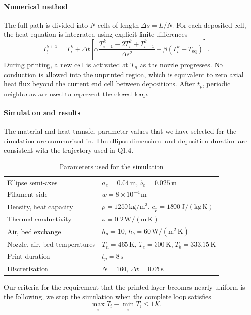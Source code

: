 \documentclass[a4paper,12pt]{article}
\begin{document}
\paragraph{Numerical method}
The full path is divided into $N$ cells of length $\Delta s=L/N$. For each deposited cell, the heat equation is integrated using explicit finite differences:
\begin{equation}
\boxed{
T_i^{k+1}=T_i^k+\Delta t\left[
\alpha\frac{T_{i+1}^k-2T_i^k+T_{i-1}^k}{\Delta s^2}
-\beta(T_i^k-T_{\mathrm{eq}})
\right].
}
\label{eq:q16discrete}
\end{equation}
During printing, a new cell is activated at $T_n$ as the nozzle progresses. No conduction is allowed into the unprinted region, which is equivalent to zero axial heat flux beyond the current end cell between depositions. After $t_p$, periodic neighbours are used to represent the closed loop.
\paragraph{Simulation and results}
The material and heat-transfer parameter values that we have selected for the simulation are summarized in. The ellipse dimensions and deposition duration are consistent with the trajectory used in Q1.4.
\begin{table}[H]
\centering
\caption{Parameters used for the simulation}
\label{tab:q16params}
\begin{tabular}{ll}
\hline
Ellipse semi-axes & $a_e=0.04\,\mathrm{m}$, $b_e=0.025\,\mathrm{m}$\\
Filament side & $w=8\times10^{-4}\,\mathrm{m}$\\
Density, heat capacity & $\rho=1250\,\mathrm{kg/m^3}$, $c_p=1800\,\mathrm{J/(kg\,K)}$\\
Thermal conductivity & $\kappa=0.2\,\mathrm{W/(m\,K)}$\\
Air, bed exchange & $h_a=10$, $h_b=60\,\mathrm{W/(m^2\,K)}$\\
Nozzle, air, bed temperatures & $T_n=465\,\mathrm{K}$, $T_e=300\,\mathrm{K}$, $T_b=333.15\,\mathrm{K}$\\
Print duration & $t_p=8\,\mathrm{s}$\\
Discretization & $N=160$, $\Delta t=0.05\,\mathrm{s}$\\
\hline
\end{tabular}
\end{table}

Our criteria for the requirement that the printed layer becomes nearly uniform is the following, we stop the simulation when the complete loop satisfies
\begin{equation}
    \max_i T_i-\min_i T_i\le 1 K.
\end{equation}
\end{document}
